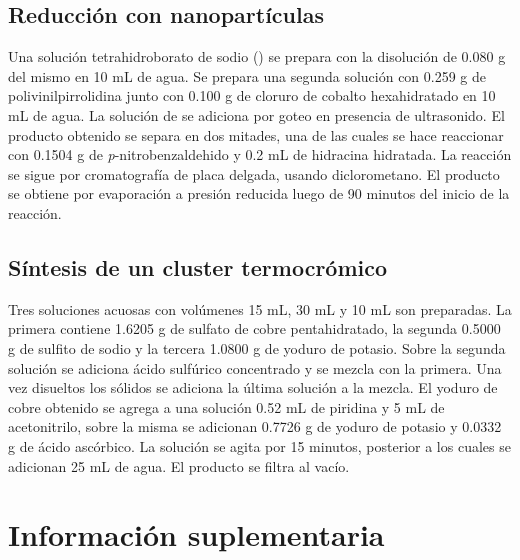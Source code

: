 \documentclass[fleqn,10pt]{SelfArx}
\begin{document}
\subsection{Reducci\'on con nanopart\'iculas}
Una soluci\'on tetrahidroborato de sodio () se prepara con la disoluci\'on de 0.080 g del mismo en 10 mL de agua. Se prepara una segunda soluci\'on con 0.259 g de polivinilpirrolidina junto con 0.100 g de cloruro de cobalto hexahidratado en 10 mL de agua. La soluci\'on de  se adiciona por goteo en presencia de ultrasonido. El producto obtenido se separa en dos mitades, una de las cuales se hace reaccionar con 0.1504 g de \textit{p}-nitrobenzaldehido y 0.2 mL de hidracina hidratada. La reacci\'on se sigue por cromatograf\'ia de placa delgada, usando diclorometano. El producto se obtiene por evaporaci\'on a presi\'on reducida luego de 90 minutos del inicio de la reacci\'on.

\subsection{S\'intesis de un cluster termocr\'omico}
Tres soluciones acuosas con vol\'umenes 15 mL, 30 mL y 10 mL son preparadas. La primera contiene 1.6205 g de sulfato de cobre pentahidratado, la segunda 0.5000 g de sulfito de sodio y la tercera 1.0800 g de yoduro de potasio. Sobre la segunda soluci\'on se adiciona \'acido sulf\'urico concentrado y se mezcla con la primera. Una vez disueltos los s\'olidos se adiciona la \'ultima soluci\'on a la mezcla. El yoduro de cobre obtenido se agrega a una soluci\'on 0.52 mL de piridina y 5 mL de acetonitrilo, sobre la misma se adicionan 0.7726 g de yoduro de potasio y 0.0332 g de \'acido asc\'orbico. La soluci\'on se agita por 15 minutos, posterior a los cuales se adicionan 25 mL de agua. El producto se filtra al vac\'io.  




\newpage
\onecolumn
\section{Informaci\'on suplementaria}\label{sec: complementaria}
\end{document}
